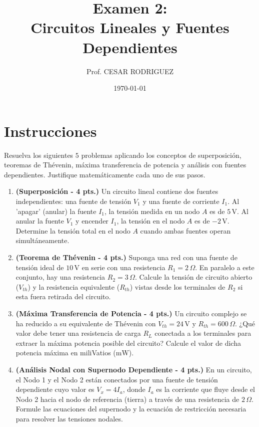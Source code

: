 \documentclass[12pt, a4paper]{article}
\title{\textbf{Examen 2: \\ Circuitos Lineales y Fuentes Dependientes}}
\author{Prof. CESAR RODRIGUEZ}
\date{\today}
\begin{document}
\maketitle

\section*{Instrucciones}
Resuelva los siguientes $5$ problemas aplicando los conceptos de superposición, teoremas de Thévenin, máxima transferencia de potencia y análisis con fuentes dependientes. Justifique matemáticamente cada uno de sus pasos.

\vspace{0.5cm}

\begin{enumerate}[leftmargin=*, itemsep=2em]

    \item \textbf{(Superposición - 4 pts.)} Un circuito lineal contiene dos fuentes independientes: una fuente de tensión $V_1$ y una fuente de corriente $I_1$. Al 'apagar' (anular) la fuente $I_1$, la tensión medida en un nodo $A$ es de $5\,\text{V}$. Al anular la fuente $V_1$ y encender $I_1$, la tensión en el nodo $A$ es de $-2\,\text{V}$. Determine la tensión total en el nodo $A$ cuando ambas fuentes operan simultáneamente.

    \item \textbf{(Teorema de Thévenin - 4 pts.)} Suponga una red con una fuente de tensión ideal de $10\,\text{V}$ en serie con una resistencia $R_1 = 2\,\Omega$. En paralelo a este conjunto, hay una resistencia $R_2 = 3\,\Omega$. Calcule la tensión de circuito abierto ($V_{th}$) y la resistencia equivalente ($R_{th}$) vistas desde los terminales de $R_2$ si esta fuera retirada del circuito.

    \item \textbf{(Máxima Transferencia de Potencia - 4 pts.)} Un circuito complejo se ha reducido a su equivalente de Thévenin con $V_{th} = 24\,\text{V}$ y $R_{th} = 600\,\Omega$. ¿Qué valor debe tener una resistencia de carga $R_L$ conectada a los terminales para extraer la máxima potencia posible del circuito? Calcule el valor de dicha potencia máxima en miliVatios ($\text{mW}$).

    \item \textbf{(Análisis Nodal con Supernodo Dependiente - 4 pts.)} En un circuito, el Nodo 1 y el Nodo 2 están conectados por una fuente de tensión dependiente cuyo valor es $V_x = 4 I_a$, donde $I_a$ es la corriente que fluye desde el Nodo 2 hacia el nodo de referencia (tierra) a través de una resistencia de $2\,\Omega$. Formule las ecuaciones del supernodo y la ecuación de restricción necesaria para resolver las tensiones nodales.


\end{enumerate}
\end{document}
